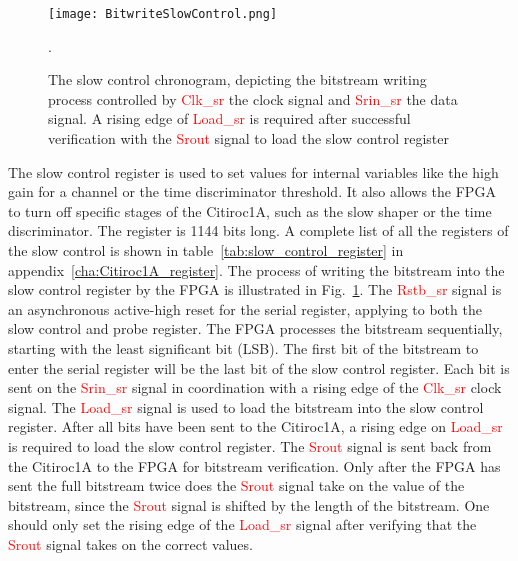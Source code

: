 \begin{figure}
    \centering
    \texttt{[image: BitwriteSlowControl.png]}
    \caption{The slow control chronogram, depicting the bitstream writing process controlled by  \textcolor{red}{Clk\_sr} the clock signal and  \textcolor{red}{Srin\_sr} the data signal. A rising edge of \textcolor{red}{Load\_sr} is required
     after successful verification with the \textcolor{red}{Srout} signal to load the slow control register\autocite{datasheetCITIROC}}.
    \label{fig:CITIROC1A_writing_bitstream}
\end{figure}
The slow control register is used to set values for internal variables like the high gain for a channel or the time discriminator threshold.
It also allows the FPGA to turn off specific stages of the Citiroc1A, such as the slow shaper or the time discriminator.
The register is 1144 bits long. A complete list of all the registers of the slow control is shown in table~\ref{tab:slow_control_register} in appendix~\ref{cha:Citiroc1A_register}.
\newline
The process of writing the bitstream into the slow control register by the FPGA is illustrated in Fig.~\ref{fig:CITIROC1A_writing_bitstream}.
\newline
The \textcolor{red}{Rstb\_sr} signal is an asynchronous active-high reset for the serial register, applying to both the slow control and probe register. 
\newline
The FPGA processes the bitstream sequentially, starting with the least significant bit (LSB).
The first bit of the bitstream to enter the serial register will be the last bit of the slow control register.
Each bit is sent on the \textcolor{red}{Srin\_sr} signal in coordination with a rising edge of the \textcolor{red}{Clk\_sr} clock signal.
\newline
The \textcolor{red}{Load\_sr} signal is used to load the bitstream into the slow control register. After all bits have been sent to the Citiroc1A,
a rising edge on \textcolor{red}{Load\_sr} is required to load the slow control register.
\newline
The \textcolor{red}{Srout} signal is sent back from the Citiroc1A to the FPGA for bitstream verification.
Only after the FPGA has sent the full bitstream twice does the \textcolor{red}{Srout} signal take on the value of the bitstream, since the \textcolor{red}{Srout} signal is shifted by the length of the bitstream\autocite{datasheetCITIROC}.
One should only set the rising edge of the \textcolor{red}{Load\_sr} signal after verifying that the \textcolor{red}{Srout} signal takes on the correct values.

